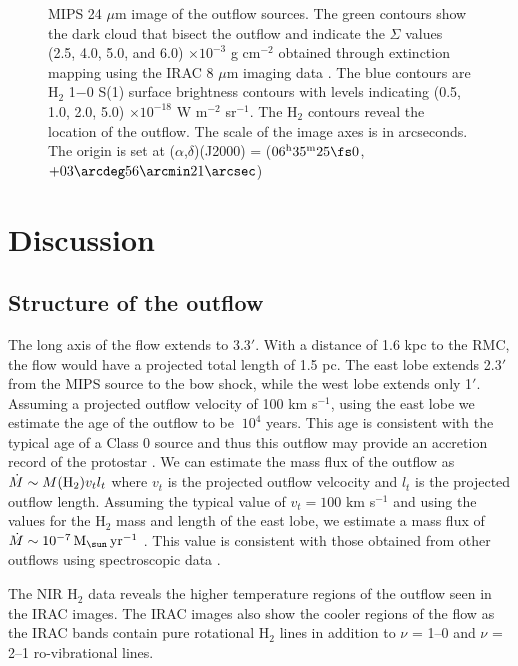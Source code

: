 \documentclass[iop]{emulateapj}
\begin{document}
\begin{figure}
\caption{ MIPS 24 $\mu$m image of the outflow sources. The green contours 
show the dark cloud that bisect the outflow and indicate
the $\Sigma$ values (2.5, 4.0, 5.0, and 6.0) $\times 10^{-3}$ g cm$^{-2}$
obtained through extinction mapping using the IRAC 8 $\mu$m imaging data \citep{but2009}. 
The blue contours are H$_2$ 1$-$0 S(1) surface brightness contours
with levels indicating (0.5, 1.0, 2.0, 5.0) $\times 10^{-18}$ W m$^{-2}$ 
sr$^{-1}$. The H$_2$ contours reveal the location of the outflow.
The scale of the image axes is in arcseconds. 
The origin is set at 
($\alpha$,$\delta$)(J2000) =
($06^{\rm{h}}35^{\rm{m}}25\fs 0$, $+03\arcdeg56\arcmin21\arcsec$)    
}
\end{figure}


\section{Discussion}

\subsection{Structure of the outflow}

The long axis of the flow extends to 3.3$'$. With a distance of 1.6
kpc to the RMC, the flow would have a projected total length of 1.5 pc. The east
lobe extends 2.3$'$ from the MIPS source to the bow shock, 
while the west lobe extends only 1$'$. Assuming a projected outflow velocity of
100 km s$^{-1}$, using the east lobe we estimate the age of the outflow to be  
$~ 10^{4}$ years.  
%
This age is consistent with the typical age of a Class 0 source and thus 
this outflow may provide an accretion record of the protostar \citep{rei2001}.
We can estimate the mass flux of the outflow as
$\dot{M} \sim M({\rm{H}}_{2}) v_{t} l_{t}$ where $v_{t}$ is the projected outflow velcocity
and  $l_{t}$ is the projected outflow length. Assuming the typical value of $v_{t} = 100$ km s$^{-1}$ and using the values for the H$_2$ mass and length of the east lobe, we
estimate a mass flux of $\dot{M} \sim 10^{-7} \, {\rm{M}}_{\sun} \,  {\rm{yr}}^{-1}$ . 
This value is consistent with those
obtained from other outflows using spectroscopic data \citep{pod2006}.  

The NIR H$_{2}$ data reveals the higher temperature
regions of the outflow seen in the IRAC images. The IRAC images also
show the cooler regions of the flow as the IRAC bands contain pure
rotational H$_2$ lines in addition to $\nu$ = 1--0 and $\nu$ = 2--1
ro-vibrational lines.
\end{document}
